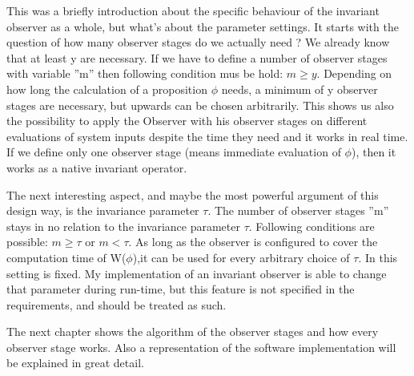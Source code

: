 This was a briefly introduction about the specific behaviour of the invariant observer as a whole, but what's about the parameter settings.
It starts with the question of how many observer stages do we actually need ? We already know that at least y are necessary.
If we have to define a number of observer stages with variable ''m'' then following condition mus be hold: $m \ge y$.
Depending on how long the calculation of a proposition $\phi$ needs, a minimum of y observer stages are necessary, but upwards 
can be chosen arbitrarily. This shows us also the possibility to apply the Observer with his observer stages
on different evaluations of system inputs despite the time they need and it works in real time.
If we define only one observer stage (means immediate evaluation of $\phi$), then it works as a native invariant operator.\newline

The next interesting aspect, and maybe the most powerful argument of this design way, is the invariance parameter $\tau$.
The number of observer stages ''m'' stays in no relation to the invariance parameter $\tau$. Following conditions are possible:
$m \ge \tau$ or $m < \tau$. As long as the observer is configured to cover the computation time of W($\phi$),it can be
used for every arbitrary choice of $\tau$. In \cite{RTFMBJ13} this setting is fixed.
My implementation of an invariant observer is able to change that parameter during run-time, but this feature is not 
specified in the requirements, and should be treated as such.\newline

The next chapter shows the algorithm of the observer stages and how every observer stage works. 
Also a representation of the software implementation will be explained in great detail.

